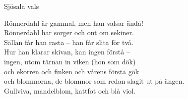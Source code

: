 \begin{song}{Sjösala vals}
	\vspace{-.05cm}
	
    \showversenumber
	Rönnerdahl är gammal, men han valsar ändå!\\
	Rönnerdahl har sorger och ont om sekiner.\\
	Sällan får han rasta -- han får slita för två.\\
	Hur han klarar skivan, kan ingen förstå --\\
	ingen, utom tärnan in viken (hon som dök)\\
	och ekorren och finken och vårens första gök\\
	och blommorna, de blommor som redan slagit ut på ängen.\\
	Gullviva, mandelblom, kattfot och blå viol.
	
\end{song}
